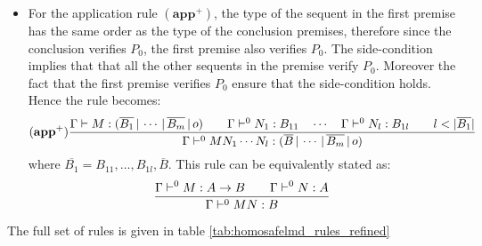 \begin{itemize}
\item For the application rule $\mathbf{(app^+)}$, the type of the sequent in the first premise has the same order
as the type of the conclusion premises, therefore since the conclusion verifies $P_0$, the first premise also verifies $P_0$.
The side-condition implies that that all the other sequents in the premise verify $P_0$. Moreover the fact
that the first premise verifies $P_0$ ensure that the side-condition holds. Hence the rule becomes:
\[ \mathbf{(app^+)} {
    {
        \Gamma \vdash M : (\overline{B_1} \, | \, \cdots \, | \, \overline{B_m} \, | \, o) \qquad
        \Gamma \vdash^0 N_1 : B_{11} \quad \cdots \quad \Gamma \vdash^0 N_{l} : B_{1l} \qquad l < |\overline{B_1}|
    }
    \over{
        \Gamma \vdash^0 M N_1 \cdots N_{l} : (\overline{B} \, | \, \cdots \, | \, \overline{B_m} \, | \, o)
    }
} \]
where $\overline{B_1} = B_{11}, \ldots, B_{1l},\overline{B}$.
This rule can be equivalently stated as:
$$ \frac{\displaystyle \Gamma \vdash^0 M : A\rightarrow B
                                        \qquad \Gamma \vdash^{0} N : A
                                   }{\Gamma  \vdash^{0} M N : B}$$
\end{itemize}

The full set of rules is given in table \ref{tab:homosafelmd_rules_refined}

